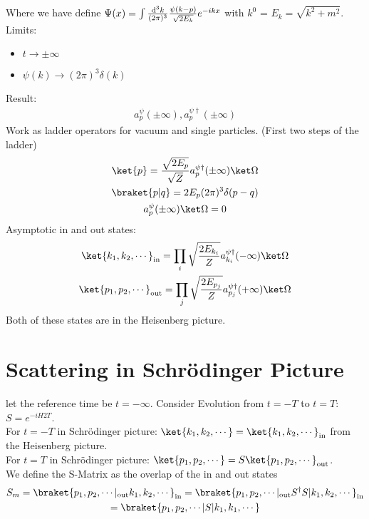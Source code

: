 \documentclass[]{scrartcl}
\begin{document}
Where we have define $\Psi(x) = \int \frac{\text d^3k}{(2\pi)^3}\frac{\psi(k-p)}{\sqrt{2E_k}}e^{-ikx}$ with $k^0$ = $E_k = \sqrt{k^2 + m^2}$.\\
Limits:
\begin{itemize}
	\item $t\rightarrow\pm\infty$
	\item $\psi(k) \rightarrow (2\pi)^3\delta(k)$
\end{itemize}
Result:
\begin{gather}
a_p^\psi(\pm\infty), a_p^{\psi\dagger}(\pm\infty)	
\end{gather}
Work as ladder operators for vacuum and single particles. (First two steps of the ladder)
\begin{gather}
	\ket{p} = \frac{\sqrt{2E_p}}{\sqrt{Z}}a_p^{\psi\dagger}(\pm\infty)\ket\Omega\\
	\braket{p|q} = 2E_p (2\pi)^3\delta(p-q)\\
	a_p^\psi(\pm\infty)\ket\Omega = 0
\end{gather}
Asymptotic in and out states:
\begin{gather}
	\ket{k_1,k_2,\cdots}_{\text{in}} = \prod_i \sqrt{\frac{2E_{k_i}}{Z}}a_{k_i}^{\psi\dagger}(-\infty)\ket\Omega\\
	\ket{p_1,p_2,\cdots}_{\text{out}} = \prod_j \sqrt\frac{2E_{p_j}}{Z} a_{p_j}^{\psi\dagger}(+\infty)\ket\Omega
\end{gather}
Both of these states are in the Heisenberg picture.

\section{Scattering in Schrödinger Picture}
let the reference time be $t=-\infty$. Consider Evolution from $t=-T$ to $t=T$: $S = e^{-iH2T}$.\\
For $t = -T$ in Schrödinger picture: $\ket{k_1,k_2,\cdots} = \ket{k_1,k_2,\cdots}_\text{in}$ from the Heisenberg picture.\\
For $t = T$ in Schrödinger picture: $\ket{p_1, p_2, \cdots} = S\ket{p_1,p_2,\cdots}_\text{out}$.\\
We define the S-Matrix as the overlap of the in and out states
\begin{gather}
S_m = \braket{p_1,p_2,\cdots|_\text{out}k_1,k_2,\cdots}_\text{in} = \braket{p_1,p_2,\cdots|_\text{out}S^\dagger S | k_1,k_2,\cdots}_\text{in}\\
= \braket{p_1,p_2,\cdots | S|k_1,k_1,\cdots}
\end{gather}
\end{document}
